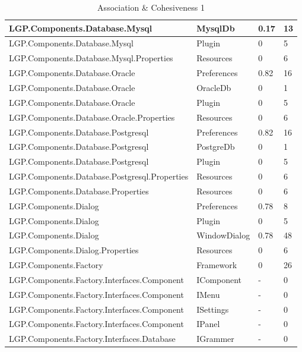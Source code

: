 \begin{table}[h!t]
{\begin{tabular}{ | p{85mm} | p{35mm} | p{13mm} | p{14mm}  | }
				LGP.Components.Database.Mysql & MysqlDb & 0.17  & 13  \\ \hline
				LGP.Components.Database.Mysql & Plugin & 0     & 5  \\ \hline
				LGP.Components.Database.Mysql.Properties & Resources & 0     & 6  \\ \hline
				LGP.Components.Database.Oracle & Preferences & 0.82  & 16  \\ \hline
				LGP.Components.Database.Oracle & OracleDb & 0     & 1  \\ \hline
				LGP.Components.Database.Oracle & Plugin & 0     & 5  \\ \hline
				LGP.Components.Database.Oracle.Properties & Resources & 0     & 6  \\ \hline
				LGP.Components.Database.Postgresql & Preferences & 0.82  & 16  \\ \hline
				LGP.Components.Database.Postgresql & PostgreDb & 0     & 1  \\ \hline
				LGP.Components.Database.Postgresql & Plugin & 0     & 5  \\ \hline
				LGP.Components.Database.Postgresql.Properties & Resources & 0     & 6  \\ \hline
				LGP.Components.Database.Properties & Resources & 0     & 6  \\ \hline
				LGP.Components.Dialog & Preferences & 0.78  & 8  \\ \hline
				LGP.Components.Dialog & Plugin & 0     & 5  \\ \hline
				LGP.Components.Dialog & WindowDialog & 0.78  & \cellcolor{ored}48  \\ \hline
				LGP.Components.Dialog.Properties & Resources & 0     & 6  \\ \hline
				LGP.Components.Factory & Framework & 0     & 26  \\ \hline
				LGP.Components.Factory.Interfaces.Component & IComponent & -     & 0  \\ \hline
				LGP.Components.Factory.Interfaces.Component & IMenu & -     & 0  \\ \hline
				LGP.Components.Factory.Interfaces.Component & ISettings & -     & 0  \\ \hline
				LGP.Components.Factory.Interfaces.Component & IPanel & -     & 0  \\ \hline
				LGP.Components.Factory.Interfaces.Database & IGrammer & -     & 0  \\ \hline
				\end{tabular}}
				
				\caption{Association \& Cohesiveness 1}			
				\label{tab:AssociationCohesiveness1}
				
			\end{table}
			
